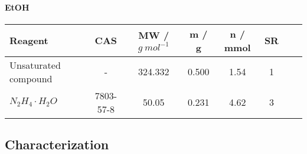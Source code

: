 \documentclass[../Master.tex]{subfiles}
\begin{document}


\paragraph{EtOH}

\begin{center}
	\begin{tabular}[b]{lccccccc}
		\toprule
		Reagent               & CAS       & MW / \(g \ mol^{-1}\) & m / g & n / mmol & SR \\
		\midrule
		Unsaturated compound  & -         & 324.332               & 0.500 & 1.54     & 1  \\
		\(N_2H_4 \cdot H_2O\) & 7803-57-8 & 50.05                 & 0.231 & 4.62     & 3  \\
		\bottomrule
	\end{tabular}
\end{center}



\newpage \subsection{Characterization}
\end{document}
